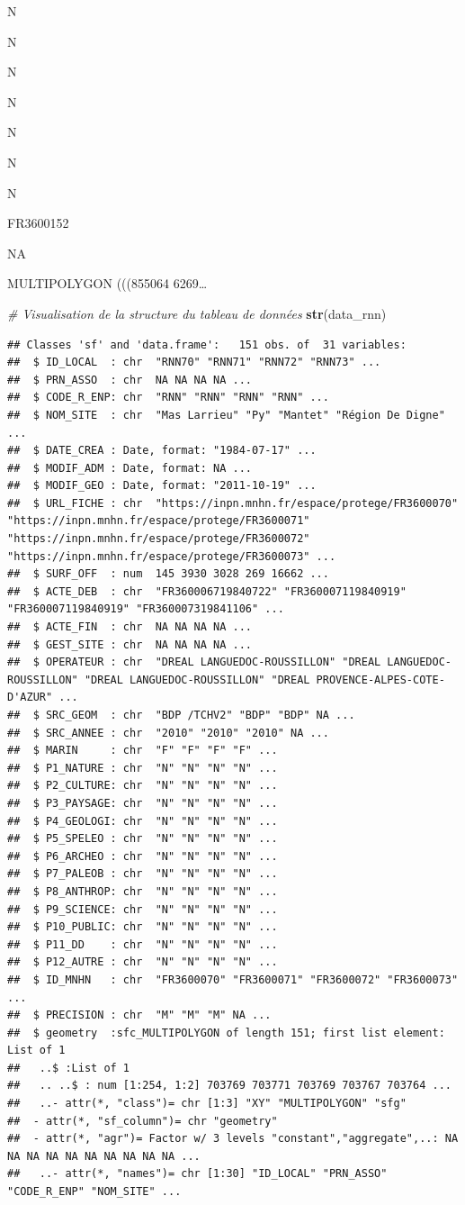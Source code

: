 \documentclass[
  french,
]{book}
\newenvironment{Shaded}{\begin{snugshade}}{\end{snugshade}}
\newcommand{\CommentTok}[1]{\textcolor[rgb]{0.56,0.35,0.01}{\textit{#1}}}
\newcommand{\KeywordTok}[1]{\textcolor[rgb]{0.13,0.29,0.53}{\textbf{#1}}}
\newcommand{\NormalTok}[1]{#1}
\begin{document}
N

N

N

N

N

N

N

FR3600152

NA

MULTIPOLYGON (((855064 6269\ldots{}

\begin{Shaded}
\begin{Highlighting}[]
\CommentTok{\# Visualisation de la structure du tableau de données}
\KeywordTok{str}\NormalTok{(data\_rnn)}
\end{Highlighting}
\end{Shaded}

\begin{verbatim}
## Classes 'sf' and 'data.frame':	151 obs. of  31 variables:
##  $ ID_LOCAL  : chr  "RNN70" "RNN71" "RNN72" "RNN73" ...
##  $ PRN_ASSO  : chr  NA NA NA NA ...
##  $ CODE_R_ENP: chr  "RNN" "RNN" "RNN" "RNN" ...
##  $ NOM_SITE  : chr  "Mas Larrieu" "Py" "Mantet" "Région De Digne" ...
##  $ DATE_CREA : Date, format: "1984-07-17" ...
##  $ MODIF_ADM : Date, format: NA ...
##  $ MODIF_GEO : Date, format: "2011-10-19" ...
##  $ URL_FICHE : chr  "https://inpn.mnhn.fr/espace/protege/FR3600070" "https://inpn.mnhn.fr/espace/protege/FR3600071" "https://inpn.mnhn.fr/espace/protege/FR3600072" "https://inpn.mnhn.fr/espace/protege/FR3600073" ...
##  $ SURF_OFF  : num  145 3930 3028 269 16662 ...
##  $ ACTE_DEB  : chr  "FR360006719840722" "FR360007119840919" "FR360007119840919" "FR360007319841106" ...
##  $ ACTE_FIN  : chr  NA NA NA NA ...
##  $ GEST_SITE : chr  NA NA NA NA ...
##  $ OPERATEUR : chr  "DREAL LANGUEDOC-ROUSSILLON" "DREAL LANGUEDOC-ROUSSILLON" "DREAL LANGUEDOC-ROUSSILLON" "DREAL PROVENCE-ALPES-COTE-D'AZUR" ...
##  $ SRC_GEOM  : chr  "BDP /TCHV2" "BDP" "BDP" NA ...
##  $ SRC_ANNEE : chr  "2010" "2010" "2010" NA ...
##  $ MARIN     : chr  "F" "F" "F" "F" ...
##  $ P1_NATURE : chr  "N" "N" "N" "N" ...
##  $ P2_CULTURE: chr  "N" "N" "N" "N" ...
##  $ P3_PAYSAGE: chr  "N" "N" "N" "N" ...
##  $ P4_GEOLOGI: chr  "N" "N" "N" "N" ...
##  $ P5_SPELEO : chr  "N" "N" "N" "N" ...
##  $ P6_ARCHEO : chr  "N" "N" "N" "N" ...
##  $ P7_PALEOB : chr  "N" "N" "N" "N" ...
##  $ P8_ANTHROP: chr  "N" "N" "N" "N" ...
##  $ P9_SCIENCE: chr  "N" "N" "N" "N" ...
##  $ P10_PUBLIC: chr  "N" "N" "N" "N" ...
##  $ P11_DD    : chr  "N" "N" "N" "N" ...
##  $ P12_AUTRE : chr  "N" "N" "N" "N" ...
##  $ ID_MNHN   : chr  "FR3600070" "FR3600071" "FR3600072" "FR3600073" ...
##  $ PRECISION : chr  "M" "M" "M" NA ...
##  $ geometry  :sfc_MULTIPOLYGON of length 151; first list element: List of 1
##   ..$ :List of 1
##   .. ..$ : num [1:254, 1:2] 703769 703771 703769 703767 703764 ...
##   ..- attr(*, "class")= chr [1:3] "XY" "MULTIPOLYGON" "sfg"
##  - attr(*, "sf_column")= chr "geometry"
##  - attr(*, "agr")= Factor w/ 3 levels "constant","aggregate",..: NA NA NA NA NA NA NA NA NA NA ...
##   ..- attr(*, "names")= chr [1:30] "ID_LOCAL" "PRN_ASSO" "CODE_R_ENP" "NOM_SITE" ...
\end{verbatim}
\end{document}
